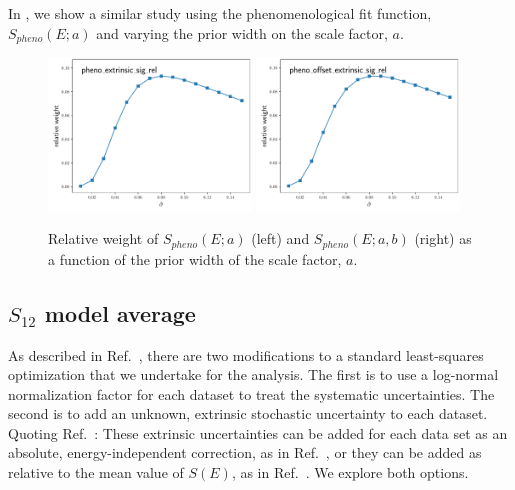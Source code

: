 \documentclass[prd,10pt,superscriptaddress,notitlepage,tightenlines,nofootinbib,floatfix]{revtex4-1}
\begin{document}
In , we show a similar study using the phenomenological fit function, $S_{pheno}(E;a)$ and varying the prior width on the scale factor, $a$.

\begin{figure}
\includegraphics[width=0.48\textwidth]{figures/pheno_extrinsic_sig_rel_prior_width_study}
\includegraphics[width=0.48\textwidth]{figures/pheno_offset_extrinsic_sig_rel_prior_width_study}
\caption{\label{fig:scale_factor_width}
Relative weight of $S_{pheno}(E;a)$ (left) and $S_{pheno}(E;a,b)$ (right) as a function of the prior width of the scale factor, $a$.}
\end{figure}


\subsection{$S_{12}$ model average \label{sec:s_12_bma}}

As described in Ref.~\cite{Moscoso:2021xog}, there are two modifications to a standard least-squares optimization that we undertake for the analysis.
The first is to use a log-normal normalization factor for each dataset to treat the systematic uncertainties.
The second is to add an unknown, extrinsic stochastic uncertainty to each dataset.  Quoting Ref.~\cite{Moscoso:2021xog}:
These extrinsic uncertainties can be added for each data set as an absolute, energy-independent correction, as in Ref.~\cite{Moscoso:2021xog}, or they can be added as relative to the mean value of $S(E)$, as in Ref.~\cite{Odell:2021tqd}.
We explore both options.
\end{document}
